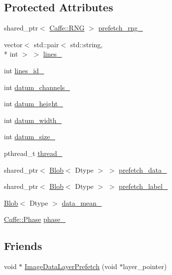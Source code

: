 \subsection*{Protected Attributes}
\begin{DoxyCompactItemize}
\item 
shared\+\_\+ptr$<$ \hyperlink{classcaffe_1_1_caffe_1_1_r_n_g}{Caffe\+::\+R\+N\+G} $>$ \hyperlink{classcaffe_1_1_image_data_layer_a57a7df530e562fa080923aab6c331ab9}{prefetch\+\_\+rng\+\_\+}
\item 
vector$<$ std\+::pair$<$ std\+::string, \\*
int $>$ $>$ \hyperlink{classcaffe_1_1_image_data_layer_a72002dc4459f0d7d739779d734a7c684}{lines\+\_\+}
\item 
int \hyperlink{classcaffe_1_1_image_data_layer_a943f32fdd8d0d37883500b6d83d4243f}{lines\+\_\+id\+\_\+}
\item 
int \hyperlink{classcaffe_1_1_image_data_layer_a6534d716642ef3d9d95d19de3c28cafb}{datum\+\_\+channels\+\_\+}
\item 
int \hyperlink{classcaffe_1_1_image_data_layer_a5eb0e9d6e6263a2c66f07f1218aeb2dd}{datum\+\_\+height\+\_\+}
\item 
int \hyperlink{classcaffe_1_1_image_data_layer_a0daa71d91a0c49e841b39e1a27112220}{datum\+\_\+width\+\_\+}
\item 
int \hyperlink{classcaffe_1_1_image_data_layer_acbfb83156d383dc61808c419e4005ad9}{datum\+\_\+size\+\_\+}
\item 
pthread\+\_\+t \hyperlink{classcaffe_1_1_image_data_layer_a4381ef240bd59045142746a3142e7583}{thread\+\_\+}
\item 
shared\+\_\+ptr$<$ \hyperlink{classcaffe_1_1_blob}{Blob}$<$ Dtype $>$ $>$ \hyperlink{classcaffe_1_1_image_data_layer_a5fdda88b05ef9bdf536544e5eb6931db}{prefetch\+\_\+data\+\_\+}
\item 
shared\+\_\+ptr$<$ \hyperlink{classcaffe_1_1_blob}{Blob}$<$ Dtype $>$ $>$ \hyperlink{classcaffe_1_1_image_data_layer_ab762b1b1fb4cfb2e8029eed41cb0ec03}{prefetch\+\_\+label\+\_\+}
\item 
\hyperlink{classcaffe_1_1_blob}{Blob}$<$ Dtype $>$ \hyperlink{classcaffe_1_1_image_data_layer_aad14555c38b6c3b7c9c4c7153c3b2006}{data\+\_\+mean\+\_\+}
\item 
\hyperlink{classcaffe_1_1_caffe_ad2993dccc4a615c39259ed7f0d0e24e9}{Caffe\+::\+Phase} \hyperlink{classcaffe_1_1_image_data_layer_ad16bb1500ecf69e5891f53794f565681}{phase\+\_\+}
\end{DoxyCompactItemize}
\subsection*{Friends}
\begin{DoxyCompactItemize}
\item 
void $\ast$ \hyperlink{classcaffe_1_1_image_data_layer_ae4bae78139298c78a305dcd72fd0895d}{Image\+Data\+Layer\+Prefetch} (void $\ast$layer\+\_\+pointer)
\end{DoxyCompactItemize}


